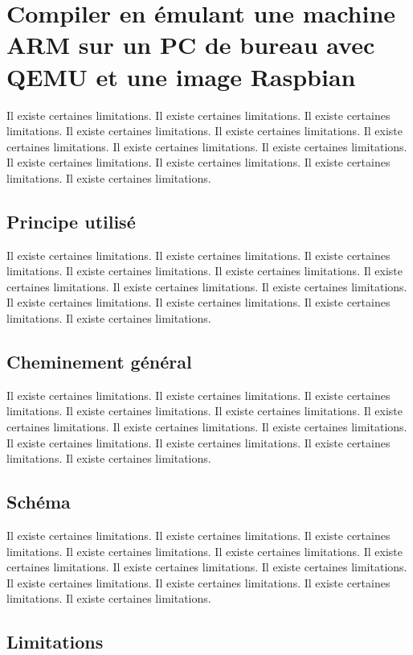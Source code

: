 \documentclass[11pt,a4paper,oneside]{report}
\begin{document}
\section{Compiler en émulant une machine ARM sur un PC de bureau avec QEMU et une image Raspbian}

Il existe certaines limitations.
Il existe certaines limitations.
Il existe certaines limitations.
Il existe certaines limitations.
Il existe certaines limitations.
Il existe certaines limitations.
Il existe certaines limitations.
Il existe certaines limitations.
Il existe certaines limitations.
Il existe certaines limitations.
Il existe certaines limitations.
Il existe certaines limitations.
\subsection{Principe utilisé}

Il existe certaines limitations.
Il existe certaines limitations.
Il existe certaines limitations.
Il existe certaines limitations.
Il existe certaines limitations.
Il existe certaines limitations.
Il existe certaines limitations.
Il existe certaines limitations.
Il existe certaines limitations.
Il existe certaines limitations.
Il existe certaines limitations.
Il existe certaines limitations.
\subsection{Cheminement général}

Il existe certaines limitations.
Il existe certaines limitations.
Il existe certaines limitations.
Il existe certaines limitations.
Il existe certaines limitations.
Il existe certaines limitations.
Il existe certaines limitations.
Il existe certaines limitations.
Il existe certaines limitations.
Il existe certaines limitations.
Il existe certaines limitations.
Il existe certaines limitations.
\subsection{Schéma}

Il existe certaines limitations.
Il existe certaines limitations.
Il existe certaines limitations.
Il existe certaines limitations.
Il existe certaines limitations.
Il existe certaines limitations.
Il existe certaines limitations.
Il existe certaines limitations.
Il existe certaines limitations.
Il existe certaines limitations.
Il existe certaines limitations.
Il existe certaines limitations.
\subsection{Limitations}
\end{document}
